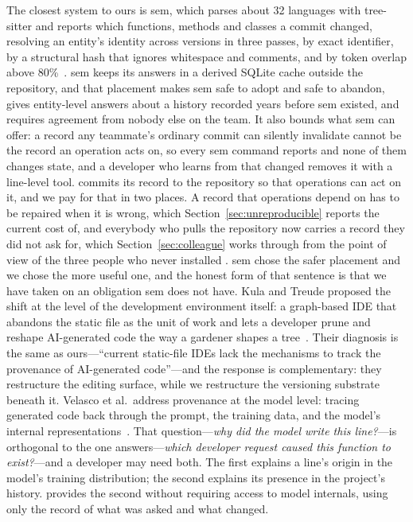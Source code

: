The closest system to ours is sem, which parses about 32 languages with
tree-sitter and reports which functions, methods and classes a commit changed,
resolving an entity's identity across versions in three passes, by exact
identifier, by a structural hash that ignores whitespace and comments, and by
token overlap above 80\%~\cite{sem2026}. sem keeps its answers in a derived SQLite
cache outside the
repository, and that placement makes sem safe to adopt and safe to abandon, gives
entity-level answers about a history recorded years before sem existed, and
requires agreement from nobody else on the team. It also bounds what sem can
offer: a record any teammate's ordinary commit can silently invalidate cannot be
the record an operation acts on, so every sem command reports and none of them
changes state, and a developer who learns from  that
 changed removes it with a line-level tool.
\sgt{} commits its record to the repository so that operations can act on it, and we pay for that in two places. A record that operations
depend on has to be repaired when it is wrong, which
Section~\ref{sec:unreproducible} reports the current cost of, and everybody who
pulls the repository now carries a record they did not ask for, which
Section~\ref{sec:colleague} works through from the point of view of the three
people who never installed \sgt{}. sem chose the safer placement and we chose the
more useful one, and the honest form of that sentence is that we have taken on an
obligation sem does not have. Kula and Treude proposed the shift at the level of
the development environment itself: a graph-based IDE that abandons the static
file as the unit of work and lets a developer prune and reshape AI-generated code
the way a gardener shapes a tree~\cite{kula2025}. Their diagnosis is the same as
ours---``current static-file IDEs lack the mechanisms to track the provenance of
AI-generated code''---and the response is complementary: they restructure the
editing surface, while we restructure the versioning substrate beneath it.
Velasco et al.\ address provenance at the model level: tracing generated code
back through the prompt, the training data, and the model's internal
representations~\cite{velasco2026provenance}. That question---\emph{why did the
model write this line?}---is orthogonal to the one \sgt{} answers---\emph{which
developer request caused this function to exist?}---and a developer may need both.
The first explains a line's origin in the model's training distribution; the
second explains its presence in the project's history. \sgt{} provides the second
without requiring access to model internals, using only the record of what was
asked and what changed.

